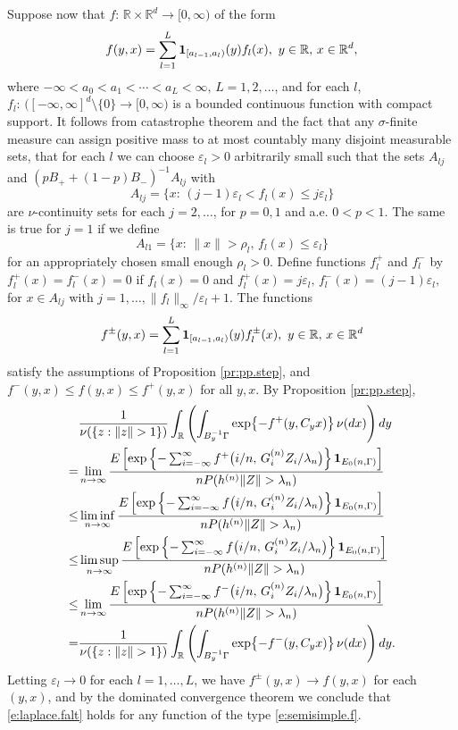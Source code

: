\documentclass[11pt,reqno]{amsart}
\numberwithin{equation}{section}
\theoremstyle{definition}
\theoremstyle{remark}
\theoremstyle{definition}
\newcommand{\eps}{\varepsilon}
\newcommand{\R}{\mathbb{R}}
\newcommand{\RR}{\mathbb{R}}
\newcommand{\bbr}{\RR}
\newcommand{\one}{{\bf 1}}
\newcommand{\vep}{\varepsilon}
\begin{document}
Suppose now that $f:\, \R\times \R^d\to [0,\infty)$ of
the form 
\begin{equation} \label{e:semisimple.f}
f(y,x)= \sum_{l=1}^L \one_{[a_{l-1},a_l)}(y) f_l(x), \ y\in\R, \, x\in\R^d,
\end{equation} 
where $-\infty<a_0<a_1<\cdots <a_L<\infty, \, L=1,2,\ldots$, and for
each $l$, $f_l:\,
 \bigl([-\infty,\infty]^d\setminus \{0\}\to [0,\infty)$ is a bounded
 continuous function with compact support. It follows from catastrophe
 theorem and the fact that any $\sigma$-finite measure can assign
 positive mass 
 to at most countably many disjoint measurable sets, that for each $l$
 we can choose 
 $\vep_l>0$ arbitrarily small such that the sets $A_{lj}$ and 
 $(pB_++(1-p)B_-)^{-1}A_{lj}$  with 
 $$  A_{lj}= \{x:\,
 (j-1)\vep_l<f_l(x)\leq j\vep_l\}
 $$
 are $\nu$-continuity sets for each
 $j=2,\ldots$, for $p=0,1$ and a.e. $0<p<1$. The same is true for
 $j=1$ if we define
 $$
 A_{l1}= \{x:\, \|x\|>\rho_l, \, 
f_l(x)\leq \vep_l\}
$$
for an appropriately chosen small enough $\rho_l>0$. Define functions
 $f_l^+$ and $f_l^-$ by $f_l^+(x) = f_l^-(x)=0$ if $f_l(x)=0$ and 
$ f_l^+(x) = j\vep_l, \, f_l^-(x) =
 (j-1)\vep_l,$ for $x\in A_{lj}$ with $j=1,\ldots,
 \|f_l\|_\infty/\eps_l+1$. The functions
 $$
 f^\pm (y,x)= \sum_{l=1}^L \one_{[a_{l-1},a_l)}(y) f^\pm_l(x), \ y\in\R, \, x\in\R^d
 $$
 satisfy the assumptions of Proposition \ref{pr:pp.step}, and
 $f^{-}(y,x)\leq f(y,x)\leq f^{+}(y,x)$ for all $y,x$. By Proposition
 \ref{pr:pp.step},
 \begin{align*}
&\frac{1}{\nu(\{z: \|z\|> 1\})}
\int_\bbr \left( \int_{B_y^{-1}\Gamma} \exp\bigl\{ -f^+(y,C_yx)\bigr\}\,
   \nu(dx)\right)dy \\
=& \lim_{n\to\infty}
   \frac{E\left[\exp\left\{ -\sum_{i=-\infty}^\infty  f^+\big(i/n, \, G_i^{(n)}
                                    Z_i/\lambda_n\big)\right\} \one_{E_0(n,\Gamma)}\right]}
{n P(h^{(n)}\|Z\|>\lambda_n)} \\
\leq & \liminf_{n\to\infty}
   \frac{E\left[\exp\left\{ -\sum_{i=-\infty}^\infty  f\big(i/n, \, G_i^{(n)}
                                    Z_i/\lambda_n\big)\right\} \one_{E_0(n,\Gamma)}\right]}
{n P(h^{(n)}\|Z\|>\lambda_n)}  \\
\leq & \limsup_{n\to\infty}
   \frac{E\left[\exp\left\{ -\sum_{i=-\infty}^\infty  f\big(i/n, \, G_i^{(n)}
                                    Z_i/\lambda_n\big)\right\} \one_{E_0(n,\Gamma)}\right]}
{n P(h^{(n)}\|Z\|>\lambda_n)}  \\
\leq & \lim_{n\to\infty}
   \frac{E\left[\exp\left\{ -\sum_{i=-\infty}^\infty  f^-\big(i/n, \, G_i^{(n)}
                                    Z_i/\lambda_n\big)\right\} \one_{E_0(n,\Gamma)}\right]}
{n P(h^{(n)}\|Z\|>\lambda_n)} \\
=&\frac{1}{\nu(\{z: \|z\|> 1\})}
\int_\bbr \left( \int_{B_y^{-1}\Gamma} \exp\bigl\{ -f^-(y,C_yx)\bigr\}\,
   \nu(dx)\right)dy.
 \end{align*}
 Letting $\vep_l\to 0$ for each $l=1,\ldots, L$, we have $f^\pm
 (y,x)\to f(y,x)$ for each $(y,x)$, and by the dominated convergence
 theorem we conclude that \eqref{e:laplace.falt} holds for any
 function of the type \eqref{e:semisimple.f}.
\end{document}
